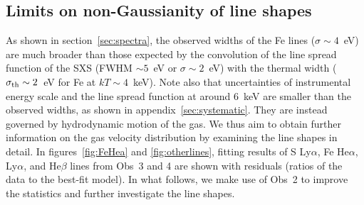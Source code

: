 \subsection{Limits on non-Gaussianity of line shapes}
\label{sec:nongaussianity}

As shown in section~\ref{sec:spectra}, the observed widths of the Fe lines ($\sigma\sim 4$~eV) are much broader than those expected by the convolution of the line spread function of the SXS (FWHM $\sim5$~eV or $\sigma\sim2$~eV) with the thermal width ($\sigma_{\rm th}\sim2$~eV for Fe at $kT\sim4$~keV). Note also that uncertainties of instrumental energy scale and the line spread function at around 6~keV are smaller than the observed widths, as shown in appendix~\ref{sec:systematic}. They are instead governed by hydrodynamic motion of the gas. We thus aim to obtain further information on the gas velocity distribution by examining the line shapes in detail. In figures~\ref{fig:FeHea} and \ref{fig:otherlines}, fitting results of S Ly$\alpha$, Fe He$\alpha$, Ly$\alpha$, and He$\beta$ lines from Obs~3 and 4 are shown with residuals (ratios of the data to the best-fit model). In what follows, we make use of Obs~2 to improve the statistics and further investigate the line shapes.

